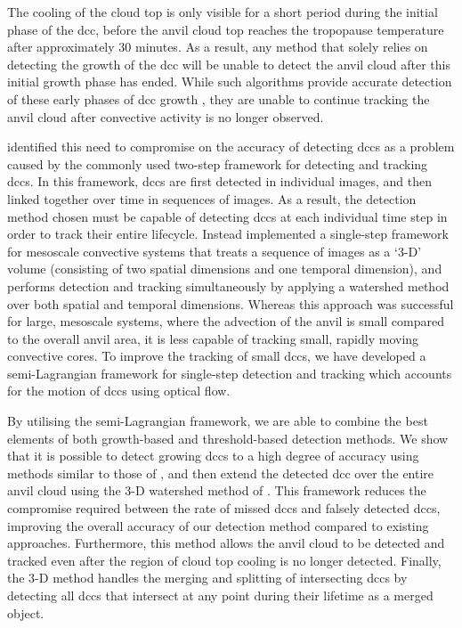 The cooling of the cloud top is only visible for a short period during the initial phase of the \acrshort{dcc}, before the anvil cloud top reaches the tropopause temperature after approximately 30 minutes.
As a result, any method that solely relies on detecting the growth of the \acrshort{dcc} will be unable to detect the anvil cloud after this initial growth phase has ended.
While such algorithms provide accurate detection of these early phases of \acrshort{dcc} growth \citep{zinner_validation_2013}, they are unable to continue tracking the anvil cloud after convective activity is no longer observed.

\citet{fiolleau_algorithm_2013} identified this need to compromise on the accuracy of detecting \acrshort{dcc}s as a problem caused by the commonly used two-step framework for detecting and tracking \acrshort{dcc}s.
In this framework, \acrshort{dcc}s are first detected in individual images, and then linked together over time in sequences of images.
As a result, the detection method chosen must be capable of detecting \acrshort{dcc}s at each individual time step in order to track their entire lifecycle.
Instead \citet{fiolleau_algorithm_2013} implemented a single-step framework for mesoscale convective systems that treats a sequence of images as a `3-D' volume (consisting of two spatial dimensions and one temporal dimension), and performs detection and tracking simultaneously by applying a watershed method over both spatial and temporal dimensions.
Whereas this approach was successful for large, mesoscale systems, where the advection of the anvil is small compared to the overall anvil area, it is less capable of tracking small, rapidly moving convective cores.
To improve the tracking of small \acrshort{dcc}s, we have developed a semi-Lagrangian framework for single-step detection and tracking which accounts for the motion of \acrshort{dcc}s using optical flow.

By utilising the semi-Lagrangian framework, we are able to combine the best elements of both growth-based and threshold-based detection methods.
We show that it is possible to detect growing \acrshort{dcc}s to a high degree of accuracy using methods similar to those of \citet{zinner_cb-tram_2008}, and then extend the detected \acrshort{dcc} over the entire anvil cloud using the 3-D watershed method of \citet{fiolleau_algorithm_2013}.
This framework reduces the compromise required between the rate of missed \acrshort{dcc}s and falsely detected \acrshort{dcc}s, improving the overall accuracy of our detection method compared to existing approaches.
Furthermore, this method allows the anvil cloud to be detected and tracked even after the region of cloud top cooling is no longer detected.
Finally, the 3-D method handles the merging and splitting of intersecting \acrshort{dcc}s by detecting all \acrshort{dcc}s that intersect at any point during their lifetime as a merged object.



